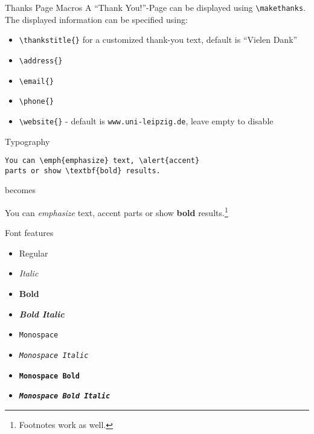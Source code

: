 \documentclass[noserifmath,aspectratio=169]{beamer}
\begin{document}
\begin{frame}[fragile]{Thanks Page Macros}
A ``Thank You!''-Page can be displayed using \verb+\makethanks+. The displayed information can be specified using:
\begin{itemize}
\item \verb+\thankstitle{}+ for a customized thank-you text, default is ``Vielen Dank''
\item \verb+\address{}+ 
\item \verb+\email{}+
\item \verb+\phone{}+
\item \verb+\website{}+ - default is \texttt{www.uni-leipzig.de}, leave empty to disable
\end{itemize}
\end{frame}

\begin{frame}[fragile]{Typography}
\begin{verbatim}
You can \emph{emphasize} text, \alert{accent} 
parts or show \textbf{bold} results.
\end{verbatim}
\begin{center}becomes\end{center}
You can \emph{emphasize} text, \alert{accent} parts or show \textbf{bold} results.\footnote{Footnotes work as well.}
\end{frame}

\begin{frame}{Font features}
  \begin{itemize}
    \item Regular
    \item \textit{Italic}
    \item \textbf{Bold}
    \item \textbf{\textit{Bold Italic}}
    \item \texttt{Monospace}
    \item \texttt{\textit{Monospace Italic}}
    \item \texttt{\textbf{Monospace Bold}}
    \item \texttt{\textbf{\textit{Monospace Bold Italic}}}
  \end{itemize}
\end{frame}
\end{document}
